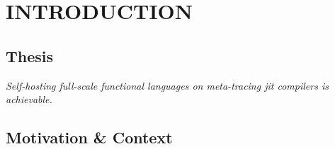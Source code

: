 \chapter[\texorpdfstring{INTRODUCTION}
                          {1. Introduction}]{INTRODUCTION}
    \label{chapter:introduction}












    \section{Thesis}

    \textit{Self-hosting full-scale functional languages on meta-tracing \gls{jit} compilers is achievable.}

    \section[\texorpdfstring{Motivation \& Context}{Context}]{Motivation \& Context}

